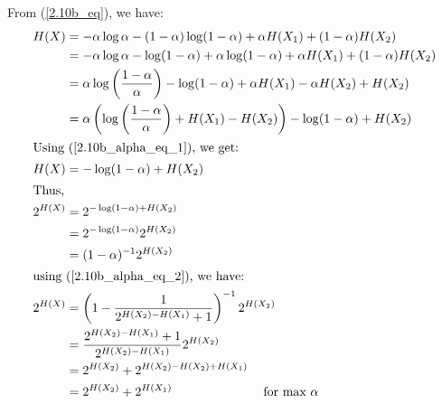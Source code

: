 \documentclass{assignment}
\begin{document}
From (\ref{2.10b_eq}), we have:
\begin{align*}
  H(X) & = -\alpha\log\alpha - (1 - \alpha)\log (1- \alpha) + \alpha H(X_1) + (1 - \alpha) H(X_2) \\
       & = -\alpha\log\alpha - \log (1- \alpha) + \alpha \log(1 - \alpha)+ \alpha H(X_1) + (1 - \alpha) H(X_2) \\
       & = \alpha\log\left( \dfrac{1 - \alpha}{\alpha} \right) - \log(1-\alpha) +\alpha H(X_1) - \alpha H(X_2) + H(X_2)\\
       & = \alpha\left( \log\left( \dfrac{1 - \alpha}{\alpha} \right) + H(X_1) - H(X_2)\right)
         - \log(1 - \alpha) + H(X_2) \\
  \shortintertext{Using (\ref{2.10b_alpha_eq_1}), we get:}
  H(X) & = -\log(1 - \alpha) + H(X_2) \\
  \shortintertext{Thus,}
  2^{H(X)} & = 2^{-\log(1 - \alpha) + H(X_2)} \\
       & = 2^{-\log(1 - \alpha)}2^{H(X_2)} \\
       & = (1-\alpha)^{-1}2^{H(X_2)} \\
\shortintertext{using (\ref{2.10b_alpha_eq_2}), we have:}
  2^{H(X)} & = \left(1 - \dfrac{1}{2^{H(X_2) - H(X_1)} + 1}\right)^{-1} 2^{H(X_2)} \\
       & = \dfrac{2^{H(X_2) - H(X_1)} + 1}{2^{H(X_2) - H(X_1)}} 2^{H(X_2)} \\
       & = 2^{H(X_2)} + 2^{H(X_2) - H(X_2) + H(X_1)} \\
       & = 2^{H(X_2)} + 2^{H(X_1)} \hspace{1in} \text{for max $\alpha$}
\end{align*}
\end{document}
